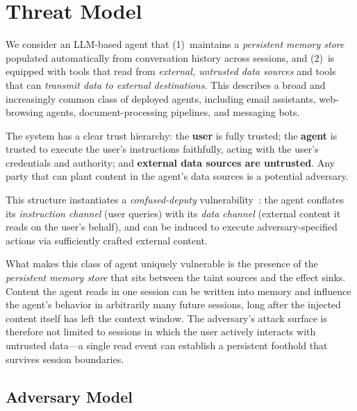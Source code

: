 \documentclass[sigconf]{acmart}
\begin{document}
\section{Threat Model}
\label{sec:threat-model}


We consider an LLM-based agent that (1)~maintains a \emph{persistent memory
store} populated automatically from conversation history 
across sessions, and (2)~is equipped with tools that read from
\emph{external, untrusted data sources} and tools that can
\emph{transmit data to external destinations}. This describes a broad and
increasingly common class of deployed agents, including email assistants,
web-browsing agents, document-processing pipelines, and messaging bots.

The system has a clear trust hierarchy: the \textbf{user} is fully trusted;
the \textbf{agent} is trusted to execute the user's instructions faithfully,
acting with the user's credentials and authority; and \textbf{external data
sources are untrusted}. Any party that can plant content in the agent's data sources
is a potential adversary.

This structure instantiates a \emph{confused-deputy}
vulnerability~\cite{hardy1988confused}: the agent conflates its
\emph{instruction channel} (user queries) with its \emph{data channel}
(external content it reads on the user's behalf), and can be induced to
execute adversary-specified actions via sufficiently crafted external content.

What makes this class of agent uniquely vulnerable is the presence of the 
\emph{persistent memory store} that sits between the taint sources and the 
effect sinks. Content the agent reads in one session can be written into 
memory and influence the agent's behavior in arbitrarily many future sessions, 
long after the injected content itself has left the context window. The 
adversary's attack surface is therefore not limited to sessions in which the 
user actively interacts with untrusted data---a single read event can 
establish a persistent foothold that survives session boundaries.

\subsection{Adversary Model}
\end{document}

